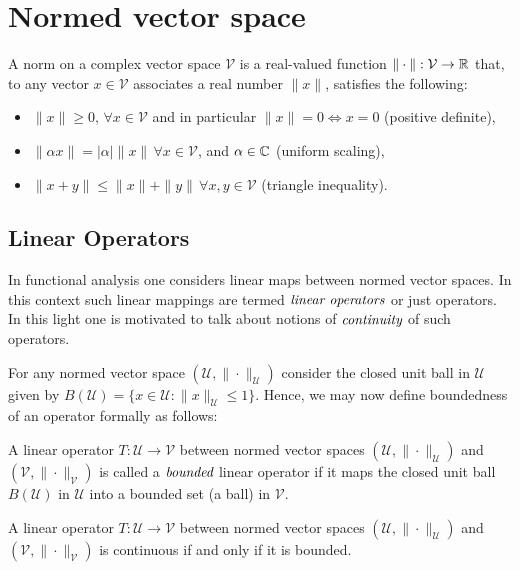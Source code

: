 \section{Normed vector space} %
\label{sec:normedvectorspace}

A norm on a complex vector space $\mathcal{V}$ is a
real-valued function $\| \cdot \| : \mathcal{V} \to \mathbb{R}$
that, to any vector $x \in \mathcal{V}$ associates a
real number $\| x \|$, satisfies the following:
\begin{itemize}
	\item $\| x \| \geq 0, \, \forall x \in \mathcal{V}$
		and in particular $\| x \| = 0 \Leftrightarrow x=0$
		(positive definite),
	\item $\| \alpha x \| = | \alpha | \| x \| \, \forall x \in \mathcal{V}$,
		and $\alpha \in \mathbb{C}$ (uniform scaling),
	\item $\| x + y \| \leq \| x \| + \| y \| \, \forall x,y \in \mathcal{V}$ (triangle inequality).
\end{itemize}

\subsection{Linear Operators}
\label{subsec:linearoperator}

In functional analysis one considers linear maps between normed vector spaces.
In this context such linear mappings are termed $\emph{linear operators}$ or just operators.
In this light one is motivated to talk about notions of $\emph{continuity}$ of such operators.

For any normed vector space $(\mathcal{U}, \| \cdot \|_{\mathcal{U}})$ consider the closed unit ball
in $\mathcal{U}$ given by $B(\mathcal{U}) = \{ x \in \mathcal{U} : \| x \|_{\mathcal{U}} \leq 1 \}$.
Hence, we may now define boundedness of an operator formally as follows:

\begin{defn}
	A linear operator $T:\mathcal{U} \to \mathcal{V}$ between normed vector spaces
	$(\mathcal{U}, \| \cdot \|_{\mathcal{U}})$ and $(\mathcal{V}, \| \cdot \|_{\mathcal{V}})$
	is called a $\emph{bounded}$ linear operator if it maps the closed unit ball
	$B(\mathcal{U})$ in $\mathcal{U}$ into a bounded set (a ball) in $\mathcal{V}$.
\end{defn}

\begin{cor}
	A linear operator $T:\mathcal{U} \to \mathcal{V}$ between normed vector spaces
	$(\mathcal{U}, \| \cdot \|_{\mathcal{U}})$ and $(\mathcal{V}, \| \cdot \|_{\mathcal{V}})$
	is continuous if and only if it is bounded.
\end{cor}
